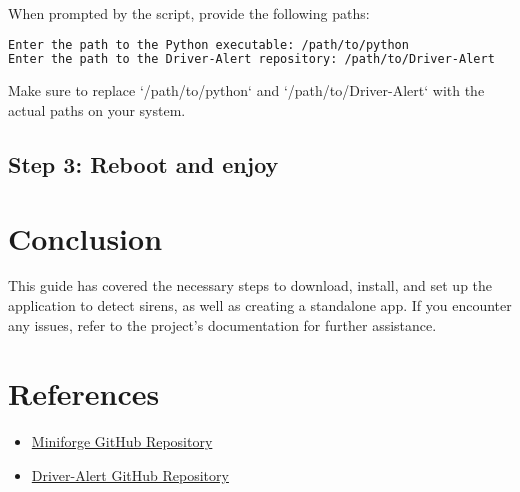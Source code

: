\documentclass{report}
\begin{document}
When prompted by the script, provide the following paths:

\begin{lstlisting}[language=bash]
Enter the path to the Python executable: /path/to/python
Enter the path to the Driver-Alert repository: /path/to/Driver-Alert
\end{lstlisting}

Make sure to replace `/path/to/python` and `/path/to/Driver-Alert` with the actual paths on your system.

\section{Step 3: Reboot and enjoy}

\chapter{Conclusion}
This guide has covered the necessary steps to download, install, and set up the application to detect sirens, as well as creating a standalone app. If you encounter any
issues, refer to the project's documentation for further assistance.


\chapter{References}
\begin{itemize}
\item \href{https://github.com/conda-forge/miniforge}{Miniforge GitHub Repository}
\item \href{https://github.com/adilonam/Driver-Alert}{Driver-Alert GitHub Repository}
\end{itemize}
\end{document}
